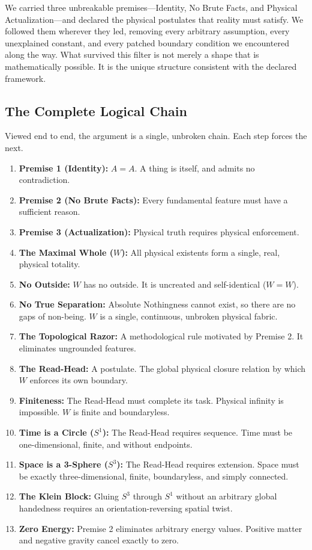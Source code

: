\documentclass[11pt]{article}
\theoremstyle{canonstyle}
\providecommand{\Sone}{S^1}
\providecommand{\Sthree}{S^3}
\begin{document}
We carried three unbreakable premises---Identity, No Brute Facts, and Physical Actualization---and declared the physical postulates that reality must satisfy. We followed them wherever they led, removing every arbitrary assumption, every unexplained constant, and every patched boundary condition we encountered along the way. What survived this filter is not merely a shape that is mathematically possible. It is the unique structure consistent with the declared framework.

\subsection{The Complete Logical Chain}

Viewed end to end, the argument is a single, unbroken chain. Each step forces the next.

\begin{chainbox}
\begin{enumerate}
    \item \textbf{Premise 1 (Identity):} $A=A$. A thing is itself, and admits no contradiction.
    \item \textbf{Premise 2 (No Brute Facts):} Every fundamental feature must have a sufficient reason.
    \item \textbf{Premise 3 (Actualization):} Physical truth requires physical enforcement.
    \item \textbf{The Maximal Whole ($W$):} All physical existents form a single, real, physical totality.
    \item \textbf{No Outside:} $W$ has no outside. It is uncreated and self-identical ($W=W$).
    \item \textbf{No True Separation:} Absolute Nothingness cannot exist, so there are no gaps of non-being. $W$ is a single, continuous, unbroken physical fabric.
    \item \textbf{The Topological Razor:} A methodological rule motivated by Premise 2. It eliminates ungrounded features.
    \item \textbf{The Read-Head:} A postulate. The global physical closure relation by which $W$ enforces its own boundary.
    \item \textbf{Finiteness:} The Read-Head must complete its task. Physical infinity is impossible. $W$ is finite and boundaryless.
    \item \textbf{Time is a Circle ($\Sone$):} The Read-Head requires sequence. Time must be one-dimensional, finite, and without endpoints.
    \item \textbf{Space is a 3-Sphere ($\Sthree$):} The Read-Head requires extension. Space must be exactly three-dimensional, finite, boundaryless, and simply connected.
    \item \textbf{The Klein Block:} Gluing $\Sthree$ through $\Sone$ without an arbitrary global handedness requires an orientation-reversing spatial twist.
    \item \textbf{Zero Energy:} Premise 2 eliminates arbitrary energy values. Positive matter and negative gravity cancel exactly to zero.
\end{enumerate}
\end{chainbox}
\end{document}
